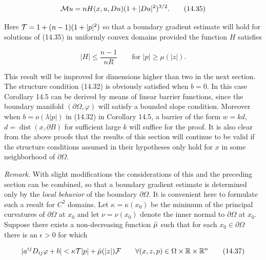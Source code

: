 \begin{equation}
\mathcal{M} u = nH(x, u, Du)(1 + |Du|^2)^{3/2}.
\tag{14.35}
\end{equation}

Here $\mathcal{T} = 1 + (n - 1)(1 + |p|^2)$ so that a boundary gradient estimate will hold for
solutions of (14.35) in uniformly convex domains provided the function $H$ satisfies

\begin{equation}
|H| \le \frac{n - 1}{nR} \qquad \text{for } |p| \ge \mu(|z|).
\tag{14.36}
\end{equation}

This result will be improved for dimensions higher than two in the next section.
The structure condition (14.32) is obviously satisfied when $b = 0$. In this case
Corollary 14.5 can be derived by means of linear barrier functions, since the
boundary manifold $(\partial\Omega,\varphi)$ will satisfy a bounded slope condition. Moreover when
$b = o(\lambda|p|)$ in (14.32) in Corollary 14.5, a barrier of the form $w = kd$, $d = \operatorname{dist}(x,\partial B)$
for sufficient large $k$ will suffice for the proof. It is also clear from the above proofs
that the results of this section will continue to be valid if the structure conditions
assumed in their hypotheses only hold for $x$ in some neighborhood of $\partial\Omega$.

\begin{remark}\label{gt14-boundary-gradient-14-r1}
\textit{Remark.} \quad With slight modifications the considerations of this and the preceding
section can be combined, so that a boundary gradient estimate is determined only
by the \textit{local behavior} of the boundary $\partial\Omega$. It is convenient here to formulate such
a result for $C^2$ domains. Let $\kappa = \kappa(x_0)$ be the minimum of the principal curvatures
of $\partial\Omega$ at $x_0$ and let $\nu = \nu(x_0)$ denote the inner normal to $\partial\Omega$ at $x_0$. Suppose there
exists a non-decreasing function $\bar{\mu}$ such that for each $x_0 \in \partial\Omega$ there is an $\epsilon > 0$
for which

\begin{equation}
|a^{ij}D_{ij}\varphi + b| < \kappa\mathcal{T}|p| + \bar{\mu}(|z|)\mathcal{F}
\qquad \forall(x, z, p) \in \Omega \times \mathbb{R} \times \mathbb{R}^n
\tag{14.37}
\end{equation}
\end{remark}


